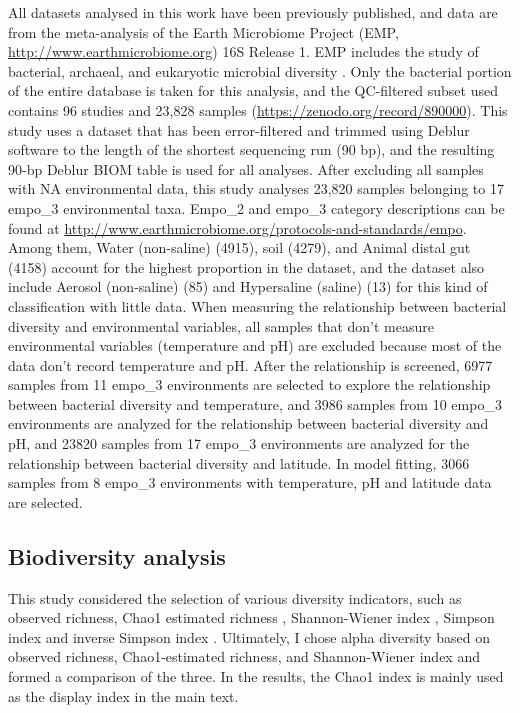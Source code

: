 \documentclass[11pt, a4paper]{article}
\begin{document}
\begin{spacing}{1.5}
All datasets analysed in this work have been previously published, and data are from the meta-analysis of the Earth Microbiome Project (EMP, \href{http://www.earthmicrobiome.org}{http://www.earthmicrobiome.org}) 16S Release 1. EMP includes the study of bacterial, archaeal, and eukaryotic microbial diversity \citep{thompson2017communal}. Only the bacterial portion of the entire database is taken for this analysis, and the QC-filtered subset used contains 96 studies and 23,828 samples (\href{https://zenodo.org/record/890000}{https://zenodo.org/record/890000}). This study uses a dataset that has been error-filtered and trimmed using Deblur software to the length of the shortest sequencing run (90 bp), and the resulting 90-bp Deblur BIOM table is used for all analyses. After excluding all samples with NA environmental data, this study analyses 23,820 samples belonging to 17 empo\_3 environmental taxa. Empo\_2 and empo\_3 category descriptions can be found at \href{http://www.earthmicrobiome.org/protocols-and-standards/empo}{http://www.earthmicrobiome.org/protocols-and-standards/empo}. Among them, Water (non-saline) (4915), soil (4279), and Animal distal gut (4158) account for the highest proportion in the dataset, and the dataset also include Aerosol (non-saline) (85) and Hypersaline (saline) (13) for this kind of classification with little data. When measuring the relationship between bacterial diversity and environmental variables, all samples that don't measure environmental variables (temperature and pH) are excluded because most of the data don't record temperature and pH. After the relationship is screened, 6977 samples from 11 empo\_3 environments are selected to explore the relationship between bacterial diversity and temperature, and 3986 samples from 10 empo\_3 environments are analyzed for the relationship between bacterial diversity and pH, and 23820 samples from 17 empo\_3 environments are analyzed for the relationship between bacterial diversity and latitude. In model fitting, 3066 samples from 8 empo\_3 environments with temperature, pH and latitude data are selected. 


\subsection{Biodiversity analysis}

This study considered the selection of various diversity indicators, such as observed richness, Chao1 estimated richness \citep{chao1984nonparametric}, Shannon-Wiener index \citep{hill2003using}, Simpson index and inverse Simpson index \citep{simpson1949measurement}. Ultimately, I chose alpha diversity based on observed richness, Chao1-estimated richness, and Shannon-Wiener index and formed a comparison of the three. In the results, the Chao1 index is mainly used as the display index in the main text.


\end{spacing}
\end{document}
